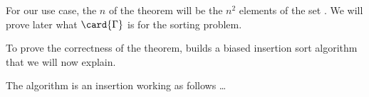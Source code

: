For our use case, the $n$ of the theorem will be the $n^2$ elements of the set
\XY. We will prove later what $\card{\Gamma}$ is for the sorting \XY problem.

To prove the correctness of the theorem, \citet{fredman:1976} builds a biased
insertion sort algorithm that we will now explain.

The algorithm is an insertion working as follows \dots

